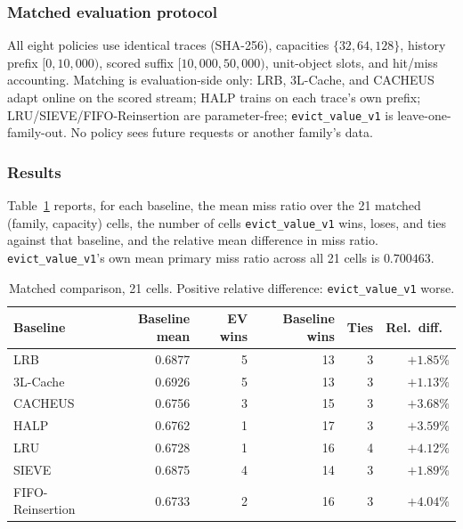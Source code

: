\documentclass[preprint,12pt]{elsarticle}
\begin{document}
\subsubsection{Matched evaluation protocol}

All eight policies use identical traces (SHA-256), capacities $\{32,64,128\}$, history prefix $[0,10{,}000)$, scored suffix $[10{,}000,50{,}000)$, unit-object slots, and hit/miss accounting. Matching is evaluation-side only: LRB, 3L-Cache, and CACHEUS adapt online on the scored stream; HALP trains on each trace's own prefix; LRU/SIEVE/FIFO-Reinsertion are parameter-free; \texttt{evict\_value\_v1} is leave-one-family-out. No policy sees future requests or another family's data.

\subsubsection{Results}

Table~\ref{tab:major1-comparison} reports, for each baseline, the mean miss ratio over the 21 matched (family, capacity) cells, the number of cells \texttt{evict\_value\_v1} wins, loses, and ties against that baseline, and the relative mean difference in miss ratio. \texttt{evict\_value\_v1}'s own mean primary miss ratio across all 21 cells is $0.700463$.

\begin{table}[!htbp]
\centering
\caption{Matched comparison, 21 cells. Positive relative difference: \texttt{evict\_value\_v1} worse.}
\label{tab:major1-comparison}
\small
\renewcommand{\arraystretch}{1.15}
\begin{tabular}{l r r r r r}
\toprule
Baseline & Baseline mean & EV wins & Baseline wins & Ties & Rel.\ diff.\ \\
\midrule
LRB              & 0.6877 & 5 & 13 & 3 & $+1.85\%$ \\
3L-Cache          & 0.6926 & 5 & 13 & 3 & $+1.13\%$ \\
CACHEUS           & 0.6756 & 3 & 15 & 3 & $+3.68\%$ \\
HALP              & 0.6762 & 1 & 17 & 3 & $+3.59\%$ \\
LRU               & 0.6728 & 1 & 16 & 4 & $+4.12\%$ \\
SIEVE             & 0.6875 & 4 & 14 & 3 & $+1.89\%$ \\
FIFO-Reinsertion  & 0.6733 & 2 & 16 & 3 & $+4.04\%$ \\
\bottomrule
\end{tabular}
\end{table}
\end{document}
